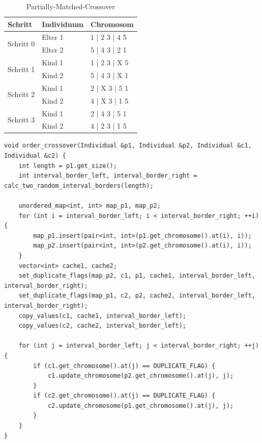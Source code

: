 \begin{table}[!htb]
\centering
\caption{Partially-Matched-Crossover}
\begin{tabularx}{0.5\textwidth}{l|l|l}
Schritt & Individuum & Chromosom\\
\hline
\multirow{2}{*}{Schritt 0}
		& Elter 1 & 1 | 2 3 | 4 5\\
		& Elter 2 & 5 | 4 3 | 2 1\\
\hline
\multirow{2}{*}{Schritt 1}
		& Kind 1 & 1 | 2 3 | X 5\\
		& Kind 2 & 5 | 4 3 | X 1\\
\hline
\multirow{2}{*}{Schritt 2}
		& Kind 1 & 2 | X 3 | 5 1\\
		& Kind 2 & 4 | X 3 | 1 5\\
\hline
\multirow{2}{*}{Schritt 3}
		& Kind 1 & 2 | 4 3 | 5 1\\
		& Kind 2 & 4 | 2 3 | 1 5\\
\end{tabularx}
\label{tab:ox}
\end{table}


\begin{minipage}[!htb]{\linewidth}
\begin{lstlisting}[caption={Order-Crossover}, firstnumber=1, captionpos=b, label=lst:ox]
void order_crossover(Individual &p1, Individual &p2, Individual &c1, Individual &c2) {
	int length = p1.get_size();
	int interval_border_left, interval_border_right = calc_two_random_interval_borders(length);

	unordered_map<int, int> map_p1, map_p2;
	for (int i = interval_border_left; i < interval_border_right; ++i) {
		map_p1.insert(pair<int, int>(p1.get_chromosome().at(i), i));
		map_p2.insert(pair<int, int>(p2.get_chromosome().at(i), i));
	}
	vector<int> cache1, cache2;
	set_duplicate_flags(map_p2, c1, p1, cache1, interval_border_left, interval_border_right);
	set_duplicate_flags(map_p1, c2, p2, cache2, interval_border_left, interval_border_right);
	copy_values(c1, cache1, interval_border_left);
	copy_values(c2, cache2, interval_border_left);

	for (int j = interval_border_left; j < interval_border_right; ++j) {
		if (c1.get_chromosome().at(j) == DUPLICATE_FLAG) {
			c1.update_chromosome(p2.get_chromosome().at(j), j);
		}
		if (c2.get_chromosome().at(j) == DUPLICATE_FLAG) {
			c2.update_chromosome(p1.get_chromosome().at(j), j);
		}
	}
}
\end{lstlisting}
\end{minipage}

